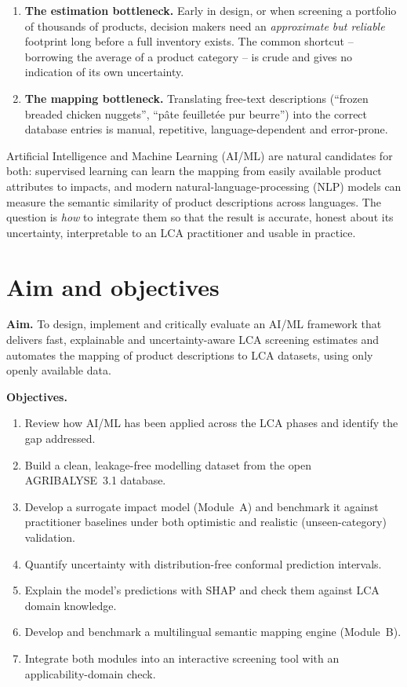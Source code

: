 \begin{enumerate}[label=\textbf{B\arabic*.}]
  \item \textbf{The estimation bottleneck.} Early in design, or when screening a portfolio of
  thousands of products, decision makers need an \emph{approximate but reliable} footprint long
  before a full inventory exists. The common shortcut -- borrowing the average of a product
  category -- is crude and gives no indication of its own uncertainty.
  \item \textbf{The mapping bottleneck.} Translating free-text descriptions (``frozen breaded
  chicken nuggets'', ``pâte feuilletée pur beurre'') into the correct database entries is
  manual, repetitive, language-dependent and error-prone.
\end{enumerate}

Artificial Intelligence and Machine Learning (AI/ML) are natural candidates for both: supervised
learning can learn the mapping from easily available product attributes to impacts, and modern
natural-language-processing (NLP) models can measure the semantic similarity of product
descriptions across languages. The question is \emph{how} to integrate them so that the result
is accurate, honest about its uncertainty, interpretable to an LCA practitioner and usable in
practice.

\section{Aim and objectives}

\textbf{Aim.} To design, implement and critically evaluate an AI/ML framework that delivers fast,
explainable and uncertainty-aware LCA screening estimates and automates the mapping of product
descriptions to LCA datasets, using only openly available data.

\noindent\textbf{Objectives.}
\begin{enumerate}[label=O\arabic*.]
  \item Review how AI/ML has been applied across the LCA phases and identify the gap addressed.
  \item Build a clean, leakage-free modelling dataset from the open AGRIBALYSE~3.1 database.
  \item Develop a surrogate impact model (Module~A) and benchmark it against practitioner
        baselines under both optimistic and realistic (unseen-category) validation.
  \item Quantify uncertainty with distribution-free conformal prediction intervals.
  \item Explain the model's predictions with SHAP and check them against LCA domain knowledge.
  \item Develop and benchmark a multilingual semantic mapping engine (Module~B).
  \item Integrate both modules into an interactive screening tool with an applicability-domain check.
\end{enumerate}

